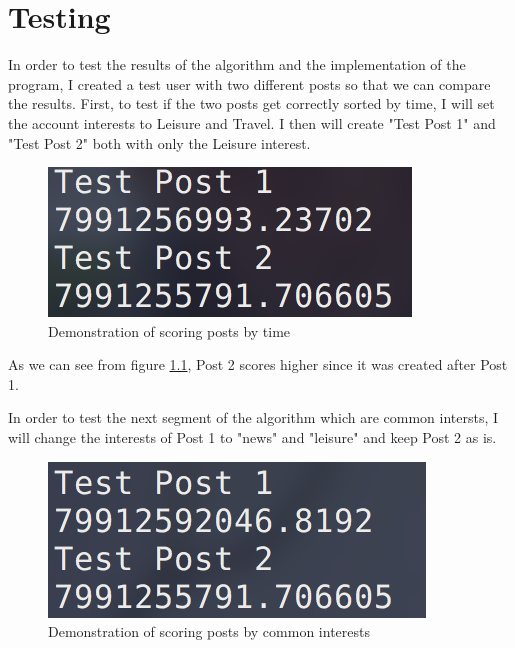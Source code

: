 
\chapter {Testing}

In order to test the results of the algorithm and the implementation of the program, I created a test user with two different posts so that we can compare the results. First, to test if the two posts get correctly sorted by time, I will set the account interests to Leisure and Travel. I then will create "Test Post 1" and "Test Post 2" both with only the Leisure interest.

\begin{figure}[htbp]
\begin{minipage}[t]{\linewidth}
  \centering
    \includegraphics[scale=1]{Figures/test_time}
    \caption{Demonstration of scoring posts by time}
    \label{test_time}
\end{minipage}%
\end{figure}

As we can see from figure \ref{test_time}, Post 2 scores higher since it was created after Post 1.

In order to test the next segment of the algorithm which are common intersts, I will change the interests of Post 1 to "news" and "leisure" and keep Post 2 as is.

\begin{figure}[htbp]
\begin{minipage}[t]{\linewidth}
  \centering
    \includegraphics[scale=1]{Figures/test_common}
    \caption{Demonstration of scoring posts by common interests}
    \label{test_common}
\end{minipage}%
\end{figure}

